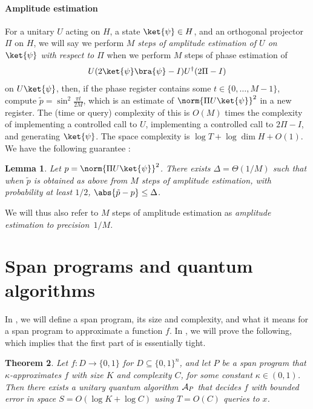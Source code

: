 \documentclass[11pt]{article}
\numberwithin{equation}{section}
\newtheorem{theorem}{Theorem}[section]
\newtheorem{lemma}[theorem]{Lemma}
\theoremstyle{definition}
\theoremstyle{plain}
\begin{document}
\paragraph{Amplitude estimation} For a unitary $U$ acting on $H$, a state $\ket{\psi}\in H$, and an orthogonal projector $\Pi$ on $H$, we will say we perform \emph{$M$ steps of amplitude estimation of $U$ on $\ket{\psi}$ with respect to $\Pi$} when we perform $M$ steps of phase estimation of 
$$U(2\ket{\psi}\bra{\psi}-I)U^\dagger (2\Pi-I)$$
on $U\ket{\psi}$, then, if the phase register contains some $t\in\{0,\dots,M-1\}$, compute $\tilde p=\sin^2\frac{\pi t}{2M}$, which is an estimate of $\norm{\Pi U\ket{\psi}}^2$ in a new register. The (time or query) complexity of this is $O(M)$ times the complexity of implementing a controlled call to $U$, implementing a controlled call to $2\Pi-I$, and generating $\ket{\psi}$. The space complexity is $\log T + \log\dim H+O(1)$. We have the following guarantee \cite{BHMT02}:
\begin{lemma}
Let $p=\norm{\Pi U\ket{\psi}}^2$. There exists $\Delta=\Theta(1/M)$ such that when $\tilde p$ is obtained as above from $M$ steps of amplitude estimation, 
with probability at least $1/2$, $\abs{\tilde p - p}\leq \Delta$. 
\end{lemma}
\noindent We will thus also refer to $M$ steps of amplitude estimation as \emph{amplitude estimation to precision~$1/M$}. 





\section{Span programs and quantum algorithms}\label{sec:span-alg}

In , we will define a span program, its size and complexity, and what it means for a span program to approximate a function $f$. In , we will prove the following, which implies that the first part of  is essentially tight. 


\begin{theorem}\label{thm:span-to-alg}
Let $f:D\rightarrow\{0,1\}$ for $D\subseteq\{0,1\}^n$, and let $P$ be a span program that $\kappa$-approximates $f$ with size $K$ and complexity $C$, for some constant $\kappa\in (0,1)$. Then there exists a unitary quantum algorithm ${\cal A}_P$ that decides $f$ with bounded error in space $S=O(\log K+\log C)$ using $T=O(C)$ queries to $x$. 
\end{theorem}
\end{document}
